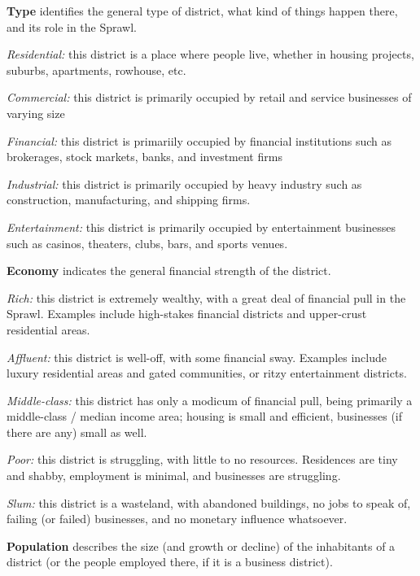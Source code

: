 \documentclass[oneside,10pt]{article}
\begin{document}
\begin{multicols}{2}
\textbf{Type} identifies the general type of district, what kind of things
happen there, and its role in the Sprawl.
\begin{dent}

\textit{Residential:} this district is a place where people live,
whether in housing projects, suburbs, apartments, rowhouse, etc.

\textit{Commercial:} this district is primarily occupied by retail and
service businesses of varying size

\textit{Financial:} this district is primariily occupied by financial institutions such as brokerages, stock markets, banks, and
investment firms

\textit{Industrial:} this district is primarily occupied by heavy industry such as construction, manufacturing, and shipping
firms.

\textit{Entertainment:} this district is primarily occupied by entertainment businesses such as casinos, theaters, clubs, bars,
and sports venues.
\end{dent}

\textbf{Economy} indicates the general financial strength of the district.
\begin{dent}

\textit{Rich:} this district is extremely wealthy, with a great deal of
financial pull in the Sprawl. Examples include high-stakes
financial districts and upper-crust residential areas.

\textit{Affluent:} this district is well-off, with some financial sway.
Examples include luxury residential areas and gated communities, or ritzy entertainment districts.

\textit{Middle-class:} this district has only a modicum of financial
pull, being primarily a middle-class / median income area;
housing is small and efficient, businesses (if there are any)
small as well.

\textit{Poor:} this district is struggling, with little to no resources.
Residences are tiny and shabby, employment is minimal,
and businesses are struggling.

\textit{Slum:} this district is a wasteland, with abandoned buildings, no jobs to speak of, failing (or failed) businesses, and
no monetary influence whatsoever.
\end{dent}

\textbf{Population} describes the size (and growth or decline) of the
inhabitants of a district (or the people employed there, if it is
a business district).
\begin{dent}


\end{dent}
\end{multicols}
\end{document}
